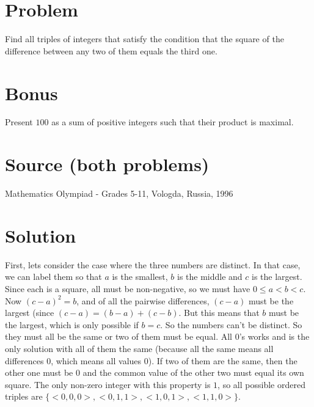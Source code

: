 \documentclass[11pt,a4paper]{report}
\theoremstyle{plain}
\theoremstyle{definition}
\theoremstyle{remark}
\begin{document}
\section*{Problem}
Find all triples of integers that satisfy the condition that the square of the difference between any two of them equals the third one.

\section*{Bonus}
Present $100$ as a sum of positive integers such that their product is maximal. 

\section*{Source (both problems)}
Mathematics Olympiad - Grades 5-11, Vologda, Russia, 1996

\newpage
\section*{Solution}
First, lets consider the case where the three numbers are distinct.  In that case, we can label them so that $a$ is the smallest, $b$ is the middle and $c$ is the largest.  Since each is a square, all must be non-negative, so we must have $0 \leq a < b < c$. Now $(c - a) ^ 2 = b$, and of all the pairwise differences, $(c - a)$ must be the largest (since $(c - a) = (b - a) + (c - b)$. But this means that $b$ must be the largest, which is only possible if $b = c$. So the numbers can't be distinct. So they must all be the same or two of them must be equal.  All 0's works and is the only solution with all of them the same (because all the same means all differences $0$, which means all values $0$). If two of them are the same, then the other one must be $0$ and the common value of the other two must equal its own square. The only non-zero integer with this property is $1$, so all possible ordered triples are $\{<0,0,0>, <0,1,1>, <1,0,1>, <1,1,0>\}$.
 
\end{document}
